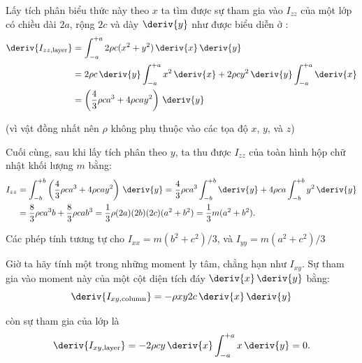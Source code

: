 \noindent
Lấy tích phân biểu thức này theo $x$ ta tìm được sự tham gia vào $I_{zz}$ của một lớp có chiều dài $2a$, rộng $2c$ và dày $\deriv{y}$ như được biểu diễn ở :
\begin{align}
\deriv{I_{zz,\text{layer}}} &= \int_{-a}^{+a} 2\rho c(x^2+y^2)\,\deriv{x}\,\deriv{y}\nonumber\\
&= 2\rho c\,\deriv{y}\int_{-a}^{+a} x^2\,\deriv{x} + 2\rho cy^2\,\deriv{y}\int_{-a}^{+a}\deriv{x} \nonumber\\
&= \left(\frac{4}{3}\rho ca^3 + 4\rho cay^2\right)\,\deriv{y}\label{eq:5_42}
\end{align}

\noindent
(vì vật đồng nhất nên $\rho$ không phụ thuộc vào các tọa độ $x$, $y$, và $z$)

Cuối cùng, sau khi lấy tích phân  theo $y$, ta thu được $I_{zz}$ của toàn hình hộp chữ nhật khối lượng $m$ bằng:
\begin{align*}
I_{zz} &= \int_{-b}^{+b} \left(\frac{4}{3}\rho ca^3+4\rho cay^2\right)\,\deriv{y} = \frac{4}{3}\rho ca^3 \int_{-b}^{+b}\deriv{y} + 4\rho ca \int_{-b}^{+b} y^2 \,\deriv{y}\\
&= \frac{8}{3}\rho ca^3b + \frac{8}{3}\rho cab^3 = \frac{1}{3} \rho (2a)(2b)(2c)(a^2+b^2) = \frac{1}{3}m(a^2+b^2).
\end{align*}

\noindent
Các phép tính tương tự cho $I_{xx}=m(b^2+c^2)/3$, và $I_{yy}=m(a^2+c^2)/3$

Giờ ta hãy tính một trong những moment ly tâm, chẳng hạn như $I_{xy}$. Sự tham gia vào moment này của một cột diện tích đáy $\deriv{x}\,\deriv{y}$ bằng:
\begin{equation*}
\deriv{I_{xy,\text{column}}} = -\rho xy2c\,\deriv{x}\,\deriv{y}
\end{equation*}

\noindent
còn sự tham gia của lớp là
\begin{equation*}
\deriv{I_{xy,\text{layer}}} = -2\rho cy\,\deriv{x} \int_{-a}^{+a}x\,\deriv{y} = 0.
\end{equation*}

